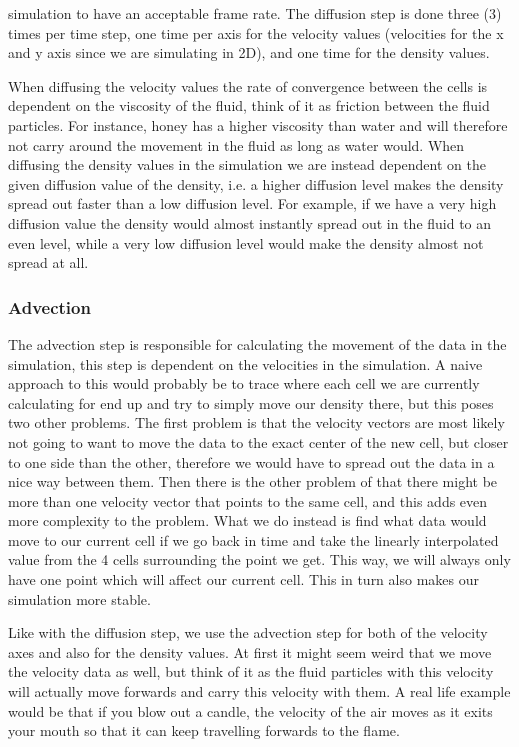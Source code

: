 \documentclass{article}
\begin{document}
\begin{multicols}{2}%
\noindent%
simulation to have an acceptable frame rate. The diffusion step is done three (3) times per time step, one time per axis for the velocity values (velocities for the x and y axis since we are simulating in 2D), and one time for the density values.

When diffusing the velocity values the rate of convergence between the cells is dependent on the viscosity of the fluid, think of it as friction between the fluid particles. For instance, honey has a higher viscosity than water and will therefore not carry around the movement in the fluid as long as water would. When diffusing the density values in the simulation we are instead dependent on the given diffusion value of the density, i.e. a higher diffusion level makes the density spread out faster than a low diffusion level. For example, if we have a very high diffusion value the density would almost instantly spread out in the fluid to an even level, while a very low diffusion level would make the density almost not spread at all.

\subsubsection{Advection}
The advection step is responsible for calculating the movement of the data in the simulation, this step is dependent on the velocities in the simulation. A naive approach to this would probably be to trace where each cell we are currently calculating for end up and try to simply move our density there, but this poses two other problems. The first problem is that the velocity vectors are most likely not going to want to move the data to the exact center of the new cell, but closer to one side than the other, therefore we would have to spread out the data in a nice way between them. Then there is the other problem of that there might be more than one velocity vector that points to the same cell, and this adds even more complexity to the problem. What we do instead is find what data would move to our current cell if we go back in time and take the linearly interpolated value from the 4 cells surrounding the point we get. This way, we will always only have one point which will affect our current cell. This in turn also makes our simulation more stable.

Like with the diffusion step, we use the advection step for both of the velocity axes and also for the density values. At first it might seem weird that we move the velocity data as well, but think of it as the fluid particles with this velocity will actually move forwards and carry this velocity with them. A real life example would be that if you blow out a candle, the velocity of the air moves as it exits your mouth so that it can keep travelling forwards to the flame.


\end{multicols}
\end{document}
